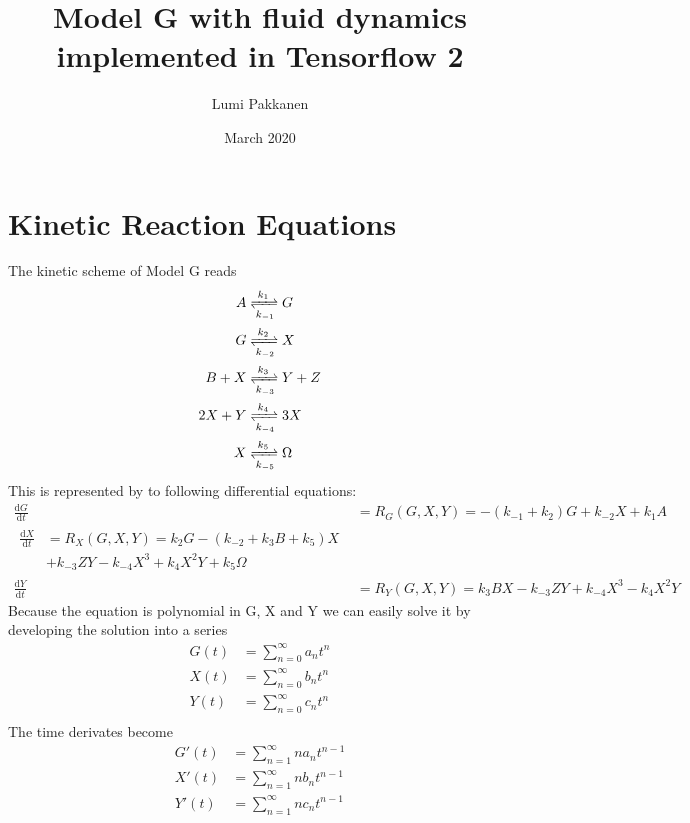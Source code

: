 \documentclass{article}
\begin{document}
\title{Model G with fluid dynamics implemented in Tensorflow 2}
\author{Lumi Pakkanen}
\date{March 2020}
\maketitle
\section{Kinetic Reaction Equations}
The kinetic scheme of Model G reads
\begin{align}
A &\xrightleftharpoons[k_{-1}]{k_1} G \\
G &\xrightleftharpoons[k_{-2}]{k_2} X \\
B+X &\xrightleftharpoons[k_{-3}]{k_3} Y+Z \\
2X+Y &\xrightleftharpoons[k_{-4}]{k_4} 3X \\
X &\xrightleftharpoons[k_{-5}]{k_5} \Omega
\end{align}
This is represented by to following differential equations:
\begin{align}
\frac{\mathrm d G}{\mathrm d t} &= R_G(G, X, Y) = -(k_{-1} + k_2) G + k_{-2} X + k_1 A \label{eq:reaction} \\
\begin{split}
\frac{\mathrm d X}{\mathrm d t} &= R_X(G, X, Y) = k_2 G - (k_{-2} + k_3 B + k_5) X \\ 
                                & + k_{-3}Z Y - k_{-4}X^3 + k_4 X^2 Y + k_5 \Omega
\end{split}\\
\frac{\mathrm d Y}{\mathrm d t} &= R_Y(G, X, Y) = k_3 B X - k_{-3} Z Y + k_{-4} X^3 - k_4 X^2 Y
\end{align}
Because the equation is polynomial in G, X and Y we can easily solve it by developing the solution into a series
\begin{align*}
G(t) &= \sum_{n=0}^{\infty}a_n t^n \\
X(t) &= \sum_{n=0}^{\infty}b_n t^n \\
Y(t) &= \sum_{n=0}^{\infty}c_n t^n \\
\end{align*}
The time derivates become
\begin{align*}
G'(t) &= \sum_{n=1}^{\infty}n a_n t^{n-1} \\
X'(t) &= \sum_{n=1}^{\infty}n b_n t^{n-1} \\
Y'(t) &= \sum_{n=1}^{\infty}n c_n t^{n-1} \\
\end{align*}
\end{document}
